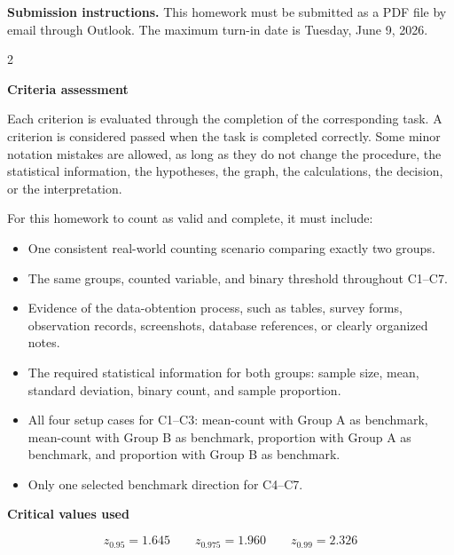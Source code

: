 \documentclass[12pt]{article}
\newcommand{\SubsectionBox}[1]{%
	\noindent\colorbox{gray!30}{%
		\parbox{\linewidth}{\textbf{#1}}%
	}\par\vspace{0.35cm}%
}
\begin{document}
	\vspace{0.25cm}
	
	\noindent
	\colorbox{gray!30}{%
		\parbox{\linewidth}{%
			\textbf{Submission instructions.} This homework must be submitted as a PDF file by email through Outlook. The maximum turn-in date is Tuesday, June 9, 2026.
		}%
	}
	
	\vspace{0.35cm}
	
	\begin{multicols}{2}
		
		\SubsectionBox{Criteria assessment}
		\vspace{-0.25cm}
		
		Each criterion is evaluated through the completion of the corresponding task. A criterion is considered passed when the task is completed correctly. Some minor notation mistakes are allowed, as long as they do not change the procedure, the statistical information, the hypotheses, the graph, the calculations, the decision, or the interpretation.
		
		For this homework to count as valid and complete, it must include:
		\begin{itemize}
			\item One consistent real-world counting scenario comparing exactly two groups.
			\item The same groups, counted variable, and binary threshold throughout C1--C7.
			\item Evidence of the data-obtention process, such as tables, survey forms, observation records, screenshots, database references, or clearly organized notes.
			\item The required statistical information for both groups: sample size, mean, standard deviation, binary count, and sample proportion.
			\item All four setup cases for C1--C3: mean-count with Group A as benchmark, mean-count with Group B as benchmark, proportion with Group A as benchmark, and proportion with Group B as benchmark.
			\item Only one selected benchmark direction for C4--C7.
		\end{itemize}
		
		\vspace{0.25cm}
		
		\SubsectionBox{Critical values used}
		\vspace{-1cm}
		\[
		z_{0.95}=1.645
		\qquad
		z_{0.975}=1.960
		\qquad
		z_{0.99}=2.326
		\]
		

\end{multicols}
\end{document}
